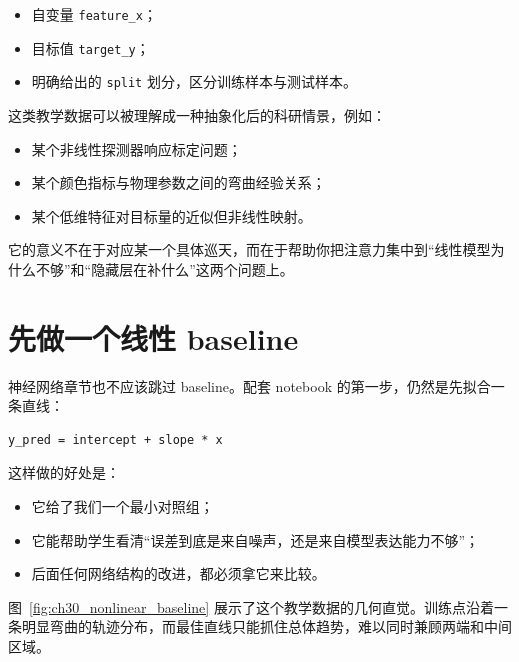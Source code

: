 \begin{itemize}
    \item 自变量 \texttt{feature\_x}；
    \item 目标值 \texttt{target\_y}；
    \item 明确给出的 \texttt{split} 划分，区分训练样本与测试样本。
\end{itemize}

这类教学数据可以被理解成一种抽象化后的科研情景，例如：

\begin{itemize}
    \item 某个非线性探测器响应标定问题；
    \item 某个颜色指标与物理参数之间的弯曲经验关系；
    \item 某个低维特征对目标量的近似但非线性映射。
\end{itemize}

它的意义不在于对应某一个具体巡天，而在于帮助你把注意力集中到“线性模型为什么不够”和“隐藏层在补什么”这两个问题上。

\section{先做一个线性 baseline}

神经网络章节也不应该跳过 baseline。配套 notebook 的第一步，仍然是先拟合一条直线：

\begin{examplebox}[线性 baseline]
\begin{lstlisting}[style=pythonstyle]
y_pred = intercept + slope * x
\end{lstlisting}
\end{examplebox}

这样做的好处是：

\begin{itemize}
    \item 它给了我们一个最小对照组；
    \item 它能帮助学生看清“误差到底是来自噪声，还是来自模型表达能力不够”；
    \item 后面任何网络结构的改进，都必须拿它来比较。
\end{itemize}

图~\ref{fig:ch30_nonlinear_baseline} 展示了这个教学数据的几何直觉。训练点沿着一条明显弯曲的轨迹分布，而最佳直线只能抓住总体趋势，难以同时兼顾两端和中间区域。

